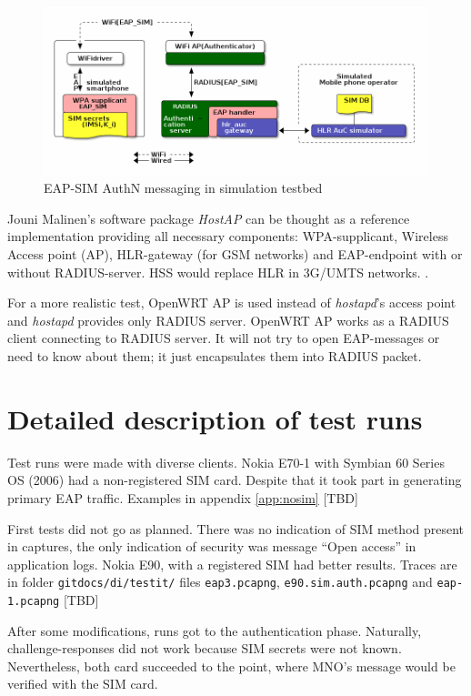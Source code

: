 \documentclass[12pt,a4paper,english]{tutthesis}
\begin{document}
\begin{figure}[htb]
\centering
\includegraphics[width=.9\linewidth]{demoinfra.png}
\caption{\label{eap-sim-testbed}EAP-SIM AuthN messaging in simulation testbed}
\end{figure}




Jouni Malinen's software package \emph{HostAP} can be thought as a reference
implementation providing all necessary components: WPA-supplicant, Wireless
Access point (AP), HLR-gateway (for GSM networks) and EAP-endpoint with
or without RADIUS-server. HSS would replace HLR in 3G/UMTS networks.
 \cite{hostapd}.

For a more realistic test, OpenWRT AP is used instead of \emph{hostapd}'s
access point and \emph{hostapd} provides only RADIUS server.
OpenWRT AP works as a RADIUS client connecting to RADIUS server. 
It will not try to open EAP-messages or need
to know about them; it just encapsulates them into RADIUS packet.

\section{Detailed description of test runs}
\label{sec-5-2}






Test runs were made with diverse clients.
Nokia E70-1 with Symbian 60 Series OS (2006) had a
non-registered SIM card. Despite that it took part in generating
primary EAP traffic.
Examples in appendix \ref{app:nosim}   [TBD]

First tests 
did not go as planned. There was no indication of SIM method
present in captures, the only indication of security was message
``Open access'' in application logs.
Nokia E90, with a registered SIM had better results. Traces
are in folder \verb~gitdocs/di/testit/~ files \verb~eap3.pcapng~,
  \verb~e90.sim.auth.pcapng~ and \verb~eap-1.pcapng~  [TBD]

After some modifications, runs got to the authentication phase.
Naturally, challenge-responses did not work because SIM secrets were
not known. Nevertheless, both card succeeded to the point, where MNO's
message would be verified with the SIM card.
\end{document}
